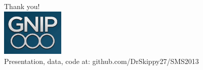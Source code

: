 \documentclass{beamer}
\begin{document}
\begin{frame}
  \begin{center}
  \Large{Thank you!  \\ [20pt]}
    \includegraphics[width=3cm]{./imgs/logo.png} \\ [15pt]
   \Large{Presentation, data, code at: github.com/DrSkippy27/SMS2013 }
  \end{center}
\end{frame}
\end{document}
